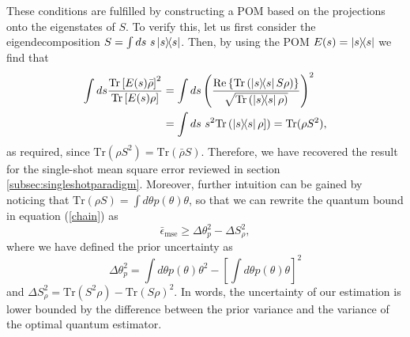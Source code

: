 These conditions are fulfilled by constructing a POM based on the projections onto the eigenstates of $S$. To verify this, let us first consider the eigendecomposition $S = \int ds~s \ketbra{s}$. Then, by using the POM $E(s) =  \ketbra{s}$ we find that
\begin{align}
\int ds  \frac{\mathrm{Tr}\left[ E(s) \bar{\rho} \right]^2}{\mathrm{Tr}\left[ E(s) \rho \right]} &= \int ds\left(\frac{\mathrm{Re}\left\lbrace\mathrm{Tr}\left(\ketbra{s} S\rho\right)\right\rbrace}{\sqrt{\mathrm{Tr}\left( \ketbra{s} \rho\right)}}\right)^2
\nonumber \\
&= \int ds~ s^2 \mathrm{Tr}\left(\ketbra{s} \rho\right]) = \mathrm{Tr}(\rho S^2),
\end{align}
as required, since $\mathrm{Tr}(\rho S^2) = \mathrm{Tr}(\bar{\rho} S)$. Therefore, we have recovered the result for the single-shot mean square error reviewed in section \ref{subsec:singleshotparadigm}. Moreover, further intuition can be gained by noticing that $\mathrm{Tr}(\rho S) = \int d\theta p(\theta) \theta$, so that we can rewrite the quantum bound in equation (\ref{chain}) as
\begin{equation}
\bar{\epsilon}_{\mathrm{mse}}\geqslant\Delta \theta^2_p - \Delta S^2_{\rho},
\label{myexpression}
\end{equation}
where we have defined the prior uncertainty as
\begin{equation}
\Delta \theta^2_p = \int d\theta p(\theta) \theta^2 - \left[\int d\theta p(\theta) \theta \right]^2
\end{equation}
and $\Delta S^2_\rho = \mathrm{Tr} \left(S^2 \rho \right) - \mathrm{Tr}\left(S \rho \right)^2$. In words, the uncertainty of our estimation is lower bounded by the difference between the prior variance and the variance of the optimal quantum estimator.


